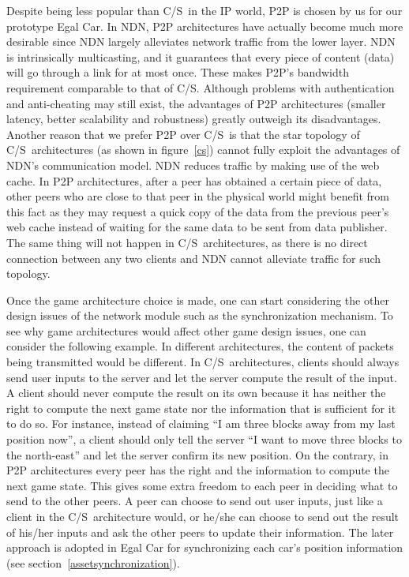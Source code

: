 \documentclass{article}
\newcommand{\cs}{C\slash S}
\begin{document}
Despite being less popular than \cs~in the IP world, P2P is chosen by us for our prototype Egal Car. In NDN, P2P architectures have actually become much more desirable since NDN largely alleviates network traffic from the lower layer. NDN is intrinsically multicasting, and it guarantees that every piece of content (data) will go through a link for at most once. These makes P2P's bandwidth requirement comparable to that of \cs. Although problems with authentication and anti-cheating may still exist, the advantages of P2P architectures (smaller latency, better scalability and robustness) greatly outweigh its disadvantages. Another reason that we prefer P2P over \cs~is that the star topology of \cs~architectures (as shown in figure~\ref{cs}) cannot fully exploit the advantages of NDN's communication model. NDN reduces traffic by making use of the web cache. In P2P architectures, after a peer has obtained a certain piece of data, other peers who are close to that peer in the physical world might benefit from this fact as they may request a quick copy of the data from the previous peer's web cache instead of waiting for the same data to be sent from data publisher. The same thing will not happen in \cs~architectures, as there is no direct connection between any two clients and NDN cannot alleviate traffic for such topology.

Once the game architecture choice is made, one can start considering the other design issues of the network module such as the synchronization mechanism. To see why game architectures would affect other game design issues, one can consider the following example. In different architectures, the content of packets being transmitted would be different. In \cs~architectures, clients should always send user inputs to the server and let the server compute the result of the input. A client should never compute the result on its own because it has neither the right to compute the next game state nor the information that is sufficient for it to do so. For instance, instead of claiming ``I am three blocks away from my last position now'', a client should only tell the server ``I want to move three blocks to the north-east'' and let the server confirm its new position. On the contrary, in P2P architectures every peer has the right and the information to compute the next game state. This gives some extra freedom to each peer in deciding what to send to the other peers. A peer can choose to send out user inputs, just like a client in the \cs~architecture would, or he/she can choose to send out the result of his/her inputs and ask the other peers to update their information. The later approach is adopted in Egal Car for synchronizing each car's position information (see section~\ref{assetsynchronization}).
\end{document}

